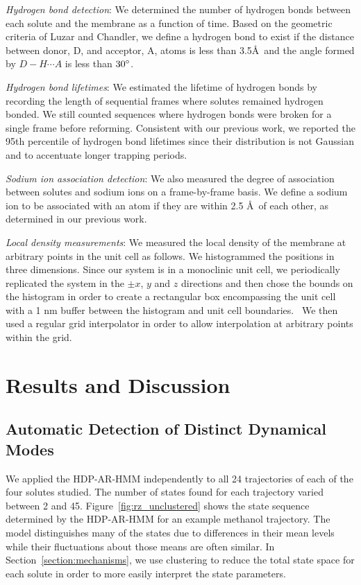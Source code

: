 \documentclass[journal=jpcbfk,manuscript=article]{achemso}
\begin{document}
  \textit{Hydrogen bond detection}: We determined the number of hydrogen bonds 
  between each solute and the membrane as a function of time. Based on the 
  geometric criteria of Luzar and Chandler, we define a hydrogen bond to exist 
  if the distance between donor, D, and acceptor, A, atoms is less than 
  3.5\AA~and the angle formed by $D-H \cdots A$ is less than $30\degree$.~\cite{luzar_effect_1996}
  
  \textit{Hydrogen bond lifetimes}: We estimated the lifetime of hydrogen bonds by 
  recording the length of sequential frames where solutes remained hydrogen bonded.
  We still counted sequences where hydrogen bonds were broken for a single frame 
  before reforming. Consistent with our previous work, we reported the 95th 
  percentile of hydrogen bond lifetimes since their distribution is not Gaussian
  and to accentuate longer trapping periods.~\cite{coscia_chemically_2019}
  
  \textit{Sodium ion association detection}: We also measured the degree of association
  between solutes and sodium ions on a frame-by-frame basis. We define a sodium ion to
  be associated with an atom if they are within 2.5 \AA~of each other, as determined 
  in our previous work.~\cite{coscia_chemically_2019}
  
  \textit{Local density measurements}: We measured the local density of the membrane at
  arbitrary points in the unit cell as follows. We histogrammed the positions in three 
  dimensions. Since our system is in a monoclinic unit cell, we periodically replicated
  the system in the $\pm x$, $y$ and $z$ directions and then chose the bounds on the
  histogram in order to create a rectangular box encompassing the unit cell with
  a 1 nm buffer between the histogram and unit cell boundaries.~\cite{van_der_walt_numpy_2011}
  We then used a regular grid interpolator in order to allow interpolation at arbitrary
  points within the grid.~\cite{virtanen_scipy_2020} 

  \section{Results and Discussion}
  
  \subsection{Automatic Detection of Distinct Dynamical Modes}\label{section:find_modes}
  
  We applied the HDP-AR-HMM independently to all 24 trajectories of each of the four solutes studied.
  The number of states found for each trajectory varied between 2 and 45.
  Figure~\ref{fig:rz_unclustered} shows the state sequence determined by the HDP-AR-HMM for
  an example methanol trajectory. The model distinguishes many of the states due to 
  differences in their mean levels while their fluctuations about those means are often 
  similar. In Section~\ref{section:mechanisms}, we use clustering to reduce the total state
  space for each solute in order to more easily interpret the state parameters.
  
\end{document}
